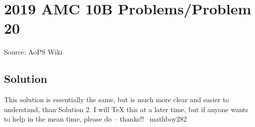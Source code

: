 \documentclass[12pt]{article}
\begin{document}
\section*{{2019 AMC 10B Problems/Problem 20}}
Source: AoPS Wiki

\subsection*{Solution}
This solution is essentially the same, but is much more clear and easier to understand, than Solution 2. I will TeX this at a later time, but if anyone wants to help in the mean time, please do -- thanks!! ~mathboy282
\end{document}

